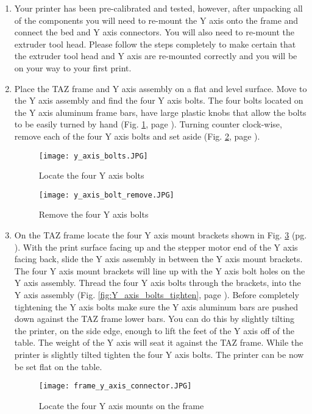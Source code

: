 \begin{enumerate}
\item Your printer has been pre-calibrated and tested, however, after unpacking all of the components you will need to re-mount the Y axis onto the frame and connect the bed and Y axis connectors. You will also need to re-mount the extruder tool head. Please follow the steps completely to make certain that the extruder tool head and Y axis are re-mounted correctly and you will be on your way to your first print.

\item Place the TAZ frame and Y axis assembly on a flat and level surface. Move to the Y axis assembly and find the four Y axis bolts. The four bolts located on the Y axis aluminum frame bars, have large plastic knobs that allow the bolts to be easily turned by hand (Fig. \ref{fig:Y_axis_bolts}, page \pageref{fig:Y_axis_bolts}). Turning counter clock-wise, remove each of the four Y axis bolts and set aside (Fig. \ref{fig:remove_Y_axis_bolts}, page \pageref{fig:remove_Y_axis_bolts}).

\begin{figure}[hp]
\centering
\texttt{[image: y\_axis\_bolts.JPG]}
\caption{Locate the four Y axis bolts}
\label{fig:Y_axis_bolts}
\end{figure}

\begin{figure}[H]
\centering
\texttt{[image: y\_axis\_bolt\_remove.JPG]}
\caption{Remove the four Y axis bolts}
\label{fig:remove_Y_axis_bolts}
\end{figure}

\item On the TAZ frame locate the four Y axis mount brackets shown in Fig. \ref{fig:frame_Y_axis_mounts} (pg. \pageref{fig:frame_Y_axis_mounts}). With the print surface facing up and the stepper motor end of the Y axis facing back, slide the Y axis assembly in between the Y axis mount brackets. The four Y axis mount brackets will line up with the Y axis bolt holes on the Y axis assembly. Thread the four Y axis bolts through the brackets, into the Y axis assembly (Fig. \ref{fig:Y_axis_bolts_tighten}, page \pageref{fig:Y_axis_bolts_tighten}). Before completely tightening the Y axis bolts make sure the Y axis aluminum bars are pushed down against the TAZ frame lower bars. You can do this by slightly tilting the printer, on the side edge, enough to lift the feet of the Y axis off of the table. The weight of the Y axis will seat it against the TAZ frame. While the printer is slightly tilted tighten the four Y axis bolts. The printer can be now be set flat on the table.
\begin{figure}[H]
\centering
\texttt{[image: frame\_y\_axis\_connector.JPG]}
\caption{Locate the four Y axis mounts on the frame}
\label{fig:frame_Y_axis_mounts}
\end{figure}


\end{enumerate}
